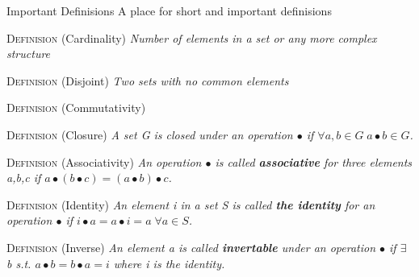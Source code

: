 \documentclass[12pt, letterpaper]{article}
\begin{document}
\begin{section}{Important Definisions}
  A place for short and important definisions

  \textsc{Definision} (Cardinality) \textit{Number of elements in a set or any
    more complex structure}

  \textsc{Definision} (Disjoint) \textit{Two sets with no common elements}

  \textsc{Definision} (Commutativity) \textit{}

  \textsc{Definision} (Closure) \textit{A set G is closed under an operation
    \(\bullet\) if \newline \(\forall a, b \in G \; a \bullet b \in G\).}

  \textsc{Definision} (Associativity) \textit{An operation \(\bullet\) is called
    \textbf{associative} for three elements a,b,c if
    \(a \bullet (b \bullet c) = (a \bullet b) \bullet c\).}

  \textsc{Definision} (Identity) \textit{An element i in a set S is called \textbf{the identity}
    for an operation \(\bullet\) if \(i \bullet a = a \bullet i = a \; \forall a \in S\).}

  \textsc{Definision} (Inverse) \textit{An element a is called \textbf{invertable} under an
    operation \(\bullet\) if \(\exists\) b s.t. \(a \bullet b = b \bullet a = i\) where
    i is the identity.}

\end{section}
\end{document}
